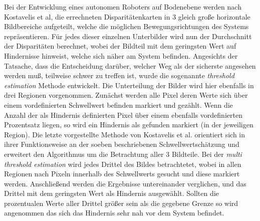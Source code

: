 \noindent
Bei der Entwicklung eines autonomen Roboters auf Bodenebene werden nach Kostavelis et al, \cite{kostavelis2010comparative} die errechneten Disparitätenkarten in 3 gleich große horizontale Bildbereiche aufgeteilt, welche die möglichen Bewegungsrichtungen des Systems repräsentieren. Für jedes dieser einzelnen Unterbilder wird nun der Durchschnitt der Disparitäten berechnet, wobei der Bildteil mit dem geringsten Wert auf Hindernisse hinweist, welche sich näher am System befinden. Angesichts der Tatsache, dass die Entscheidung darüber, welcher Weg als der sicherste angesehen werden muß, teilweise schwer zu treffen ist, wurde die sogenannte \emph{threshold estimation} Methode entwickelt. Die Unterteilung der Bilder wird hier ebenfalls in drei Regionen vorgenommen. Zunächst werden alle Pixel deren Werte sich über einem vordefinierten Schwellwert befinden markiert und gezählt. Wenn die Anzahl der als Hindernis definierten Pixel über einem ebenfalls vordefinierten Prozentsatz liegen, so wird ein Hindernis als gefunden markiert (in der jeweiligen Region). Die letzte vorgestellte Methode von Kostavelis et al. orientiert sich in ihrer Funktionsweise an der soeben beschriebenen Schwellwertschätzung und erweitert den Algorithmus um die Betrachtung aller 3 Bildteile. Bei der \emph{multi threshold estimation} wird jedes Drittel des Bildes betrachtetet, wobei in allen Regionen nach Pixeln innerhalb des Schwellwerts gesucht und diese markiert werden. Anschließend werden die Ergebnisse untereinander verglichen, und das Drittel mit dem geringsten Wert als Hindernis ausgewählt. Sollten die prozentualen Werte aller Drittel größer sein als die gegebene Grenze so wird angenommen das sich das Hindernis sehr nah vor dem System befindet.\\

